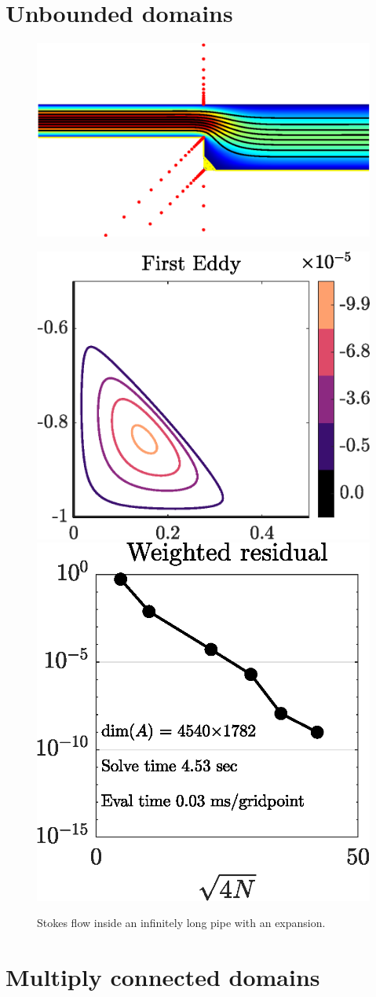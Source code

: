\section{Unbounded domains \label{sec:unbounded}}


\begin{figure}[H]
	\centering
	\includegraphics[width=\linewidth]{Figures/chan}
	
	\vspace{2em}
	\includegraphics[width=0.45\linewidth]{Figures/chan_eddy}
	\hfill
	\includegraphics[width=0.45\linewidth]{Figures/chan_conv}
	
	\label{fig:chan}
	\caption{Stokes flow inside an infinitely long pipe with an expansion.}
\end{figure} 

\section{Multiply connected domains \label{sec:multiply}}


